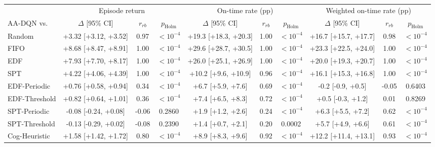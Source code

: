 \begin{tabular}{lccccccccc}
\toprule
 & \multicolumn{3}{c}{Episode return} & \multicolumn{3}{c}{On-time rate (pp)} & \multicolumn{3}{c}{Weighted on-time rate (pp)} \\
\cmidrule(lr){2-4}\cmidrule(lr){5-7}\cmidrule(lr){8-10}
AA-DQN vs. & $\Delta$ [95\% CI] & $r_{rb}$ & $p_{\mathrm{Holm}}$ & $\Delta$ [95\% CI] & $r_{rb}$ & $p_{\mathrm{Holm}}$ & $\Delta$ [95\% CI] & $r_{rb}$ & $p_{\mathrm{Holm}}$ \\
\midrule
Random & +3.32 [+3.12, +3.52] & 0.97 & $<10^{-4}$ & +19.3 [+18.3, +20.3] & 1.00 & $<10^{-4}$ & +16.7 [+15.7, +17.7] & 0.98 & $<10^{-4}$ \\
FIFO & +8.68 [+8.47, +8.91] & 1.00 & $<10^{-4}$ & +29.6 [+28.7, +30.5] & 1.00 & $<10^{-4}$ & +23.3 [+22.5, +24.0] & 1.00 & $<10^{-4}$ \\
EDF & +7.93 [+7.70, +8.17] & 1.00 & $<10^{-4}$ & +26.0 [+25.1, +26.9] & 1.00 & $<10^{-4}$ & +20.0 [+19.3, +20.7] & 1.00 & $<10^{-4}$ \\
SPT & +4.22 [+4.06, +4.39] & 1.00 & $<10^{-4}$ & +10.2 [+9.6, +10.9] & 0.96 & $<10^{-4}$ & +16.1 [+15.3, +16.8] & 1.00 & $<10^{-4}$ \\
EDF-Periodic & +0.76 [+0.58, +0.94] & 0.34 & $<10^{-4}$ & +6.7 [+5.9, +7.6] & 0.69 & $<10^{-4}$ & -0.2 [-0.9, +0.5] & -0.05 & 0.6403 \\
EDF-Threshold & +0.82 [+0.64, +1.01] & 0.36 & $<10^{-4}$ & +7.4 [+6.5, +8.3] & 0.72 & $<10^{-4}$ & +0.5 [-0.3, +1.2] & 0.01 & 0.8269 \\
SPT-Periodic & -0.08 [-0.24, +0.08] & -0.06 & 0.2860 & +1.9 [+1.2, +2.6] & 0.24 & $<10^{-4}$ & +6.3 [+5.5, +7.2] & 0.62 & $<10^{-4}$ \\
SPT-Threshold & -0.13 [-0.29, +0.02] & -0.08 & 0.2390 & +1.4 [+0.7, +2.1] & 0.20 & 0.0002 & +5.7 [+4.9, +6.6] & 0.61 & $<10^{-4}$ \\
Cog-Heuristic & +1.58 [+1.42, +1.72] & 0.80 & $<10^{-4}$ & +8.9 [+8.3, +9.6] & 0.92 & $<10^{-4}$ & +12.2 [+11.4, +13.1] & 0.93 & $<10^{-4}$ \\
\bottomrule
\end{tabular}